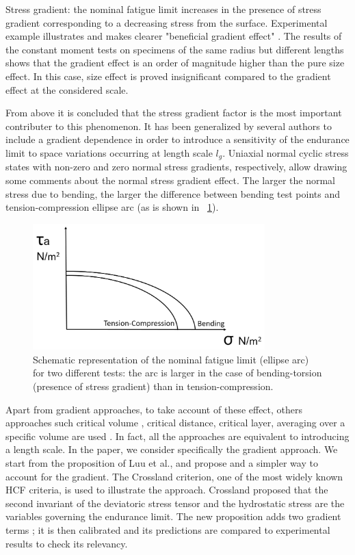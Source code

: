 \documentclass[3p,times,procedia,number]{elsarticle}
\newcommand{\figref}[1]{\figurename~\ref{#1}}
\begin{document}
Stress gradient: the nominal fatigue limit increases in the presence of stress gradient corresponding to a decreasing stress from the surface. Experimental example illustrates and makes clearer "beneficial gradient effect" \cite{Papadopoulos1996513}. The results of the constant moment tests on specimens of the same radius but different lengths shows that the gradient effect is an order of magnitude higher than the pure size effect. In this case, size effect is proved insignificant compared to the gradient effect at the considered scale.

From above it is concluded that the stress gradient factor is the most important contributer to this phenomenon. It has been generalized by several authors to include a  gradient dependence \cite{Papadopoulos1996513} in order to  introduce a sensitivity of the endurance limit to space variations occurring at length scale  $l_g$. Uniaxial normal cyclic stress states with non-zero and zero normal stress gradients, respectively, allow drawing some comments about the normal stress gradient effect. The larger the normal stress due to bending, the larger the difference between bending test points and tension-compression ellipse arc (as is shown in \figref{fig2}).
\begin{figure}[!h]
	\centering
	\includegraphics[width=0.8\textwidth]{figures//fig2.jpg} 
	\caption{Schematic representation of the nominal fatigue limit (ellipse arc) for two different tests: the arc is larger in the case of bending-torsion (presence of stress gradient) than in tension-compression.}
	\label{fig2}
\end{figure}

Apart from gradient approaches\cite{Amargier20101904}\cite{Papadopoulos1996513}, to take account of these effect, others approaches such critical volume \cite{maitournam2009fatigue}, critical distance\cite{taylor2010theory}\cite{Araujo200795}, critical layer\cite{flavenot1983epaisseur}, averaging over a specific volume \cite{palin2000stress}\cite{Banvillet2003755} are used . In fact, all the approaches are equivalent to introducing a length scale. 
In the paper, we consider specifically the gradient approach. We start from the proposition of Luu et al., and propose and a simpler way to account for the gradient. The Crossland criterion, one of the most widely known HCF criteria, is used to illustrate the approach. Crossland proposed that the second invariant of the deviatoric stress tensor and the hydrostatic stress are the variables governing the endurance limit. 
The new proposition adds two gradient terms ; it is then calibrated and its predictions are compared to experimental results to check its relevancy.
\end{document}
